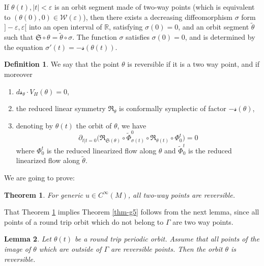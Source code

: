 \documentclass[10pt]{amsart}
\let\epsilon\varepsilon
\newcommand{\Rm}{\mathbb{R}}
\newcommand{\gR}{\ensuremath{\mathfrak{R}}}
\newcommand{\gS}{\ensuremath{\mathfrak{S}}}
\newcommand{\ms}{\ensuremath{\mathscr{s}}}
\newcommand{\mW}{\ensuremath{\mathcal{W}}}
\theoremstyle{plain}
\newtheorem{lem}{Lemma}
\newtheorem{thm}{Theorem}
\theoremstyle{definition}
\newtheorem{defn}[lem]{Definition}
\begin{document}
If $\theta(t), |t|<\epsilon$ is an orbit segment made of two-way points (which is equivalent to $(\theta(0),0)\in \mW(\epsilon)$), then
there exists a decreasing diffeomorphism $\sigma $ form $]-\epsilon,\epsilon[$ into an open interval of $\Rm$, satisfying
$\sigma(0)=0$, and an orbit segment
$\tilde \theta$ such that $\gS\circ \theta = \tilde \theta\circ \sigma$. The function $\sigma$ satisfies $\sigma(0)=0$, and is determined by the equation
$ \sigma'(t)=-\ms(\theta(t))$.

\begin{defn}\label{def-rp}
We say that the point $\theta$ is reversible if it is a two way point, and if moreover
\begin{enumerate}
\item
$d\ms_{\theta}\cdot V_H(\theta)=0$,
\item
the reduced linear symmetry $\gR_{\theta}$ is conformally symplectic of factor $-\ms(\theta)$,
\item
denoting by $\theta(t)$ the orbit of $\theta$, we have
\[
\partial_{t|t=0} \big(\gR_{\gS(\theta)}\circ\tilde \Phi_{\sigma(t)}^0\circ\gR_{\theta(t)}\circ \Phi_0^t\big) =0
\]
where $\Phi_0^t$ is the reduced linearized flow along $\theta$ and $\tilde \Phi_0^t$ is the reduced linearized flow along $\tilde \theta$.
\end{enumerate}
\end{defn}

We are going to prove:

\begin{thm}\label{thm-twr}
For generic $u\in C^{\infty}(M)$, all two-way points are reversible.
\end{thm}

That Theorem \ref{thm-twr} implies Theorem \ref{thm-g5} follows from the next lemma, since all points
of a round trip orbit which do not belong to $\Gamma$ are two way points.

\begin{lem}\label{lem-rtr}
Let $\theta(t)$ be a round trip periodic orbit. Assume that all points of the image of $\theta$ which are outside of $\Gamma$ are reversible points. Then the orbit $\theta$ is reversible.
\end{lem}
\end{document}
